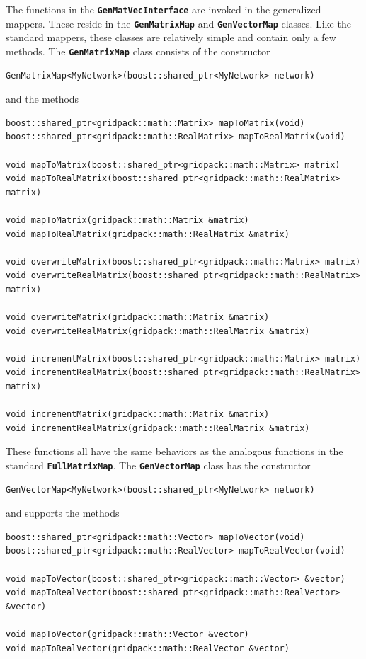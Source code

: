 The functions in the \texttt{\textbf{GenMatVecInterface}} are invoked in the generalized mappers. These reside in the \texttt{\textbf{GenMatrixMap}} and \texttt{\textbf{GenVectorMap}} classes. Like the standard mappers, these classes are relatively simple and contain only a few methods. The \texttt{\textbf{GenMatrixMap}} class consists of the constructor

{
\color{red}
\begin{Verbatim}[fontseries=b]
GenMatrixMap<MyNetwork>(boost::shared_ptr<MyNetwork> network)
\end{Verbatim}
}

and the methods

{
\color{red}
\begin{Verbatim}[fontseries=b]
boost::shared_ptr<gridpack::math::Matrix> mapToMatrix(void)
boost::shared_ptr<gridpack::math::RealMatrix> mapToRealMatrix(void)

void mapToMatrix(boost::shared_ptr<gridpack::math::Matrix> matrix)
void mapToRealMatrix(boost::shared_ptr<gridpack::math::RealMatrix> matrix)

void mapToMatrix(gridpack::math::Matrix &matrix)
void mapToRealMatrix(gridpack::math::RealMatrix &matrix)

void overwriteMatrix(boost::shared_ptr<gridpack::math::Matrix> matrix)
void overwriteRealMatrix(boost::shared_ptr<gridpack::math::RealMatrix> matrix)

void overwriteMatrix(gridpack::math::Matrix &matrix)
void overwriteRealMatrix(gridpack::math::RealMatrix &matrix)

void incrementMatrix(boost::shared_ptr<gridpack::math::Matrix> matrix)
void incrementRealMatrix(boost::shared_ptr<gridpack::math::RealMatrix> matrix)

void incrementMatrix(gridpack::math::Matrix &matrix)
void incrementRealMatrix(gridpack::math::RealMatrix &matrix)
\end{Verbatim}
}

These functions all have the same behaviors as the analogous functions in the standard \texttt{\textbf{FullMatrixMap}}. The \texttt{\textbf{GenVectorMap}} class has the constructor

{
\color{red}
\begin{Verbatim}[fontseries=b]
GenVectorMap<MyNetwork>(boost::shared_ptr<MyNetwork> network)
\end{Verbatim}
}

and supports the methods

{
\color{red}
\begin{Verbatim}[fontseries=b]
boost::shared_ptr<gridpack::math::Vector> mapToVector(void)
boost::shared_ptr<gridpack::math::RealVector> mapToRealVector(void)

void mapToVector(boost::shared_ptr<gridpack::math::Vector> &vector)
void mapToRealVector(boost::shared_ptr<gridpack::math::RealVector> &vector)

void mapToVector(gridpack::math::Vector &vector)
void mapToRealVector(gridpack::math::RealVector &vector)
\end{Verbatim}
}

